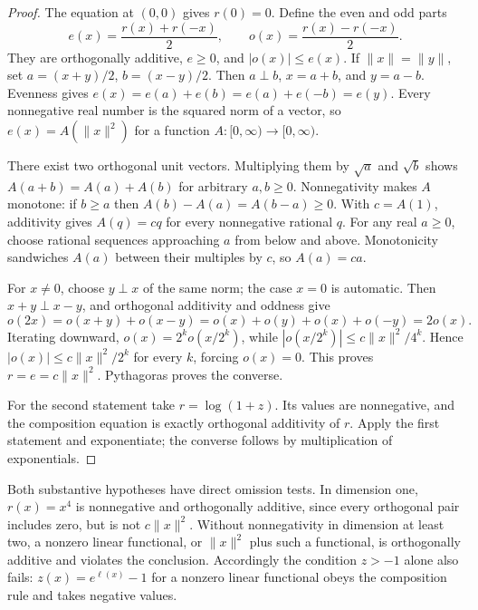 \begin{proof}
The equation at $(0,0)$ gives $r(0)=0$.  Define the even and odd parts
\[
 e(x)=\frac{r(x)+r(-x)}2,\qquad
 o(x)=\frac{r(x)-r(-x)}2.
\]
They are orthogonally additive, $e\geq0$, and $|o(x)|\leq e(x)$.
If $\|x\|=\|y\|$, set $a=(x+y)/2$, $b=(x-y)/2$.  Then $a\perp b$,
$x=a+b$, and $y=a-b$.  Evenness gives
$e(x)=e(a)+e(b)=e(a)+e(-b)=e(y)$.  Every nonnegative real number is
the squared norm of a vector, so $e(x)=A(\|x\|^2)$ for a function
$A:[0,\infty)\to[0,\infty)$.

There exist two orthogonal unit vectors.  Multiplying them by
$\sqrt a$ and $\sqrt b$ shows $A(a+b)=A(a)+A(b)$ for arbitrary
$a,b\geq0$.  Nonnegativity makes $A$ monotone: if $b\geq a$ then
$A(b)-A(a)=A(b-a)\geq0$.  With $c=A(1)$, additivity gives
$A(q)=cq$ for every nonnegative rational $q$.  For any real $a\geq0$,
choose rational sequences approaching $a$ from below and above.
Monotonicity sandwiches $A(a)$ between their multiples by $c$, so
$A(a)=ca$.

For $x\ne0$, choose $y\perp x$ of the same norm; the case $x=0$ is
automatic.  Then $x+y\perp x-y$, and orthogonal additivity and oddness
give
\[
 o(2x)=o(x+y)+o(x-y)
      =o(x)+o(y)+o(x)+o(-y)=2o(x).
\]
Iterating downward, $o(x)=2^ko(x/2^k)$, while
$|o(x/2^k)|\leq c\|x\|^2/4^k$.  Hence
$|o(x)|\leq c\|x\|^2/2^k$ for every $k$, forcing $o(x)=0$.
This proves $r=e=c\|x\|^2$.  Pythagoras proves the converse.

For the second statement take $r=\log(1+z)$.  Its values are
nonnegative, and the composition equation is exactly orthogonal
additivity of $r$.  Apply the first statement and exponentiate;
the converse follows by multiplication of exponentials.
\end{proof}

Both substantive hypotheses have direct omission tests.  In dimension
one, $r(x)=x^4$ is nonnegative and orthogonally additive, since every
orthogonal pair includes zero, but is not $c\|x\|^2$.  Without
nonnegativity in dimension at least two, a nonzero linear functional,
or $\|x\|^2$ plus such a functional, is orthogonally additive and
violates the conclusion.  Accordingly the condition $z>-1$ alone
also fails: $z(x)=e^{\ell(x)}-1$ for a nonzero linear functional
obeys the composition rule and takes negative values.

